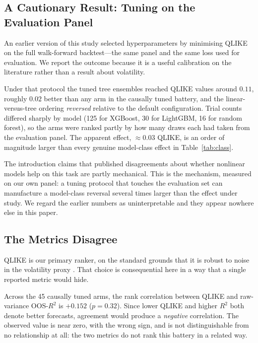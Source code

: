 \subsection{A Cautionary Result: Tuning on the Evaluation Panel}
\label{sec:tuning_leak}

An earlier version of this study selected hyperparameters by minimising QLIKE
on the full walk-forward backtest---the same panel and the same loss used for
evaluation. We report the outcome because it is a useful calibration on the
literature rather than a result about volatility.

Under that protocol the tuned tree ensembles reached QLIKE values around
$0.11$, roughly $0.02$ better than any arm in the causally tuned battery, and
the linear-versus-tree ordering \emph{reversed} relative to the default
configuration. Trial counts differed sharply by model (125 for XGBoost, 30 for
LightGBM, 16 for random forest), so the arms were ranked partly by how many
draws each had taken from the evaluation panel. The apparent effect,
$\approx 0.03$ QLIKE, is an order of magnitude larger than every genuine
model-class effect in Table~\ref{tab:class}.

The introduction claims that published disagreements about whether nonlinear
models help on this task are partly mechanical. This is the mechanism,
measured on our own panel: a tuning protocol that touches the evaluation set
can manufacture a model-class reversal several times larger than the effect
under study. We regard the earlier numbers as uninterpretable and they appear
nowhere else in this paper.

\subsection{The Metrics Disagree}
\label{sec:metric_disagreement}

QLIKE is our primary ranker, on the standard grounds that it is robust to
noise in the volatility proxy \citep{Patton2011}. That choice is consequential
here in a way that a single reported metric would hide.

Across the 45 causally tuned arms, the rank correlation between QLIKE and
raw-variance OOS-$R^2$ is $+0.152$ ($p = 0.32$). Since lower QLIKE and higher
$R^2$ both denote better forecasts, agreement would produce a \emph{negative}
correlation. The observed value is near zero, with the wrong sign, and is not
distinguishable from no relationship at all: the two metrics do not rank this
battery in a related way.

